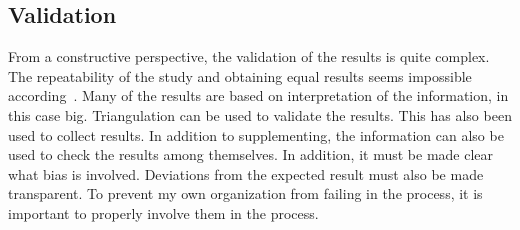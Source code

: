 \begin{comment}
\item[RQ1]- What knowledge, in the role of software engineer, is needed to use Ampersand.
\item[RQ2]- What are the Concepts, Relationships and Rules in the \acrshort{big}.
\item[RQ3]- How are the laws and regulations set up so that they can be used in a useful way for the Ampersand method.
\item[RQ4]- What are the strengths and weaknesses (SWOT) in using Ampersand for registry systems for a government organization.
\end{comment}



\subsection{Validation}
\begin{comment}
hoe check je de validiteit van de bevindingen
Possibly the paper is using standardized questionnaires, or the references provide leads to other articles that have contained the information, or you have to take the material as having face validity and validate it more thoroughly yourself. Otherwise, the indication is that this is sloppy reporting, so don't bother!

During data gathering: You should validate your information through yes, triangulation method and exercise your objective judgment as to the data informants or participants or respondents have shared. After collating data, go back to them and ask if you got things or ideas right as they had revealed or shared. (esp. for qualitative data).
After everything is done:
Organize a meeting or conference of major stakeholders, key players, key informants or participants of your study. They will form part of your audience as you present and validate the research report that you have drafted. Note of their comments and suggestions needed to finalize the report or final output.
\end{comment}
From a constructive perspective, the validation of the results is quite complex.
The repeatability of the study and obtaining equal results seems impossible according~\cite{sandelowski_rigor_1993}.
Many of the results are based on interpretation of the information, in this case \acrfull{big}.
Triangulation can be used to validate the results.
This has also been used to collect results.
In addition to supplementing, the information can also be used to check the results among themselves.
In addition, it must be made clear what bias is involved.
Deviations from the expected result must also be made transparent.
To prevent my own organization from failing in the process, it is important to properly involve them in the process.

